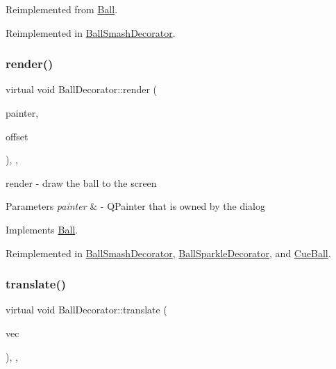 Reimplemented from \mbox{\hyperlink{class_ball_aacc57301046fab52930f7615073136e0}{Ball}}.



Reimplemented in \mbox{\hyperlink{class_ball_smash_decorator_a017998926f2b3ebdfcf49e074ea86aae}{Ball\+Smash\+Decorator}}.

\mbox{\label{class_ball_decorator_af8205f8033b2490ecd3365c24ff5cdeb}} 
\subsubsection{\texorpdfstring{render()}{render()}}
{\footnotesize\ttfamily virtual void Ball\+Decorator\+::render (\begin{DoxyParamCaption}\item[{Q\+Painter \&}]{painter,  }\item[{const Q\+Vector2D \&}]{offset }\end{DoxyParamCaption})\hspace{0.3cm}{\ttfamily [inline]}, {\ttfamily [override]}, {\ttfamily [virtual]}}



render -\/ draw the ball to the screen 


\begin{DoxyParams}{Parameters}
{\em painter} & -\/ Q\+Painter that is owned by the dialog \\
\hline
\end{DoxyParams}


Implements \mbox{\hyperlink{class_ball_a307773aaa59aee90cef8767b0c22deca}{Ball}}.



Reimplemented in \mbox{\hyperlink{class_ball_smash_decorator_a8cbf47d481100f16f2376670fee9fdcc}{Ball\+Smash\+Decorator}}, \mbox{\hyperlink{class_ball_sparkle_decorator_ad3ee562f1cc9dfa5835bca2fab3d30a7}{Ball\+Sparkle\+Decorator}}, and \mbox{\hyperlink{class_cue_ball_a915a83205e4cfc720fbd884b045e2f81}{Cue\+Ball}}.

\mbox{\label{class_ball_decorator_aae30ba0b71629db797e0ea2639c5e32d}} 
\subsubsection{\texorpdfstring{translate()}{translate()}}
{\footnotesize\ttfamily virtual void Ball\+Decorator\+::translate (\begin{DoxyParamCaption}\item[{Q\+Vector2D}]{vec }\end{DoxyParamCaption})\hspace{0.3cm}{\ttfamily [inline]}, {\ttfamily [override]}, {\ttfamily [virtual]}}



